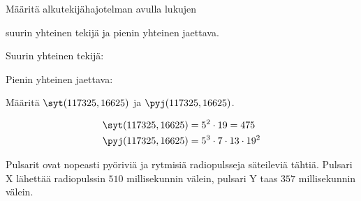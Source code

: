 \begin{kotitehtavasivu}
\begin{tehtava}
\end{tehtava}

\begin{tehtava}
    Määritä alkutekijähajotelman avulla lukujen
    \begin{alakohdat}
    \end{alakohdat}
    suurin yhteinen tekijä ja pienin yhteinen jaettava.

    \begin{vastaus}
        Suurin yhteinen tekijä:
        \begin{alakohdatrivi}
        \end{alakohdatrivi}

        Pienin yhteinen jaettava:
        \begin{alakohdat}
        \end{alakohdat}
    \end{vastaus}
    
\end{tehtava}

\begin{tehtava}
    Määritä $\syt(117325, 16625)$ ja $\pyj(117325, 16625)$.
    
    \begin{vastaus}
        \begin{align*}
        \syt(117325, 16625) &= 5^2\cdot 19 = 475 \\
        \pyj(117325, 16625) &= 5^3\cdot 7\cdot 13\cdot 19^2
        \end{align*}
    \end{vastaus}
    
\end{tehtava}

\begin{tehtava}
    Pulsarit ovat nopeasti pyöriviä ja rytmisiä radiopulsseja säteileviä tähtiä. Pulsari X lähettää radiopulssin $510$ millisekunnin välein, pulsari Y taas $357$ millisekunnin välein.

    \begin{alakohdat}
    \end{alakohdat}


\end{tehtava}
\end{kotitehtavasivu}
